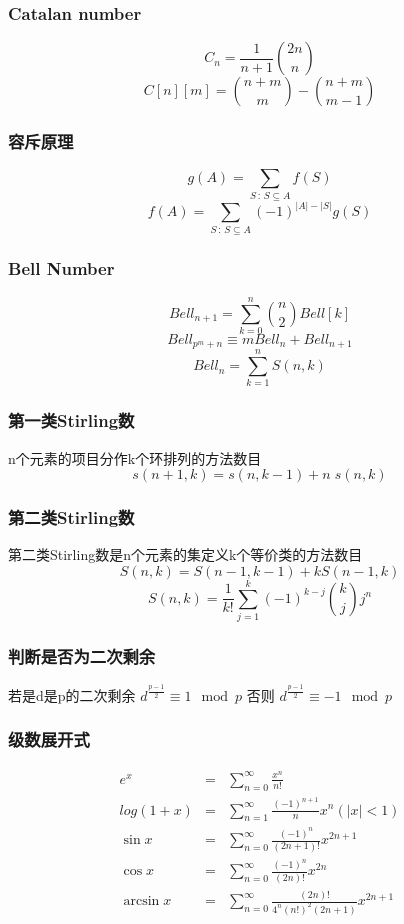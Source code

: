 \subsubsection{Catalan number}
\[ C_n = \frac{1}{n+1}{2n \choose n} \]
\[ C[n][m] = {n+m \choose m} - {n+m \choose m-1} \]
\subsubsection{容斥原理}
\[ g(A)=\sum_{S\,:\,S\subseteq A}f(S) \]
\[ f(A)=\sum_{S\,:\,S\subseteq A}(-1)^{\left|A\right|-\left|S\right|}g(S) \]
\subsubsection{Bell Number}
\[Bell_{n+1} = \sum\limits_{k=0}^n {n\choose 2} Bell[k] \]
\[Bell_{p^m+n} \equiv mBell_{n} + Bell_{n+1} \]
\[Bell_n = \sum\limits_{k=1}^{n} S(n,k) \]
\subsubsection{第一类Stirling数}
n个元素的项目分作k个环排列的方法数目
\[s(n+1,k)=s(n,k-1) + n \; s(n,k) \]
\subsubsection{第二类Stirling数}
第二类Stirling数是n个元素的集定义k个等价类的方法数目
\[S(n,k) = S(n-1,k-1) + k S(n-1,k)\]
\[S(n,k) =\frac{1}{k!}\sum_{j=1}^{k}(-1)^{k-j} {k\choose j} j^n \]
\subsubsection{判断是否为二次剩余}
若是d是p的二次剩余 $ d^{\frac{p-1}{2}} \equiv 1 \mod p $
否则 $ d^{\frac{p-1}{2}} \equiv -1 \mod p $
\subsubsection{级数展开式}
\begin{eqnarray*}
	e^x &=& \sum\limits_{n=0}^{\infty} \frac{x^n}{n!} \\
	log(1+x) &=& \sum\limits_{n=1}^{\infty} \frac{(-1)^{n+1}}{n}x^n (|x| < 1) \\
	\sin x &=& \sum\limits_{n=0}^{\infty} \frac{(-1)^n}{(2n+1)!}x^{2n+1} \\
	\cos x &=& \sum\limits_{n=0}^{\infty} \frac{(-1)^n}{(2n)!}x^{2n} \\
	\arcsin x &=& \sum\limits_{n=0}^{\infty} \frac{(2n)!}{4^n(n!)^2(2n+1)} x^{2n+1}
\end{eqnarray*} 
